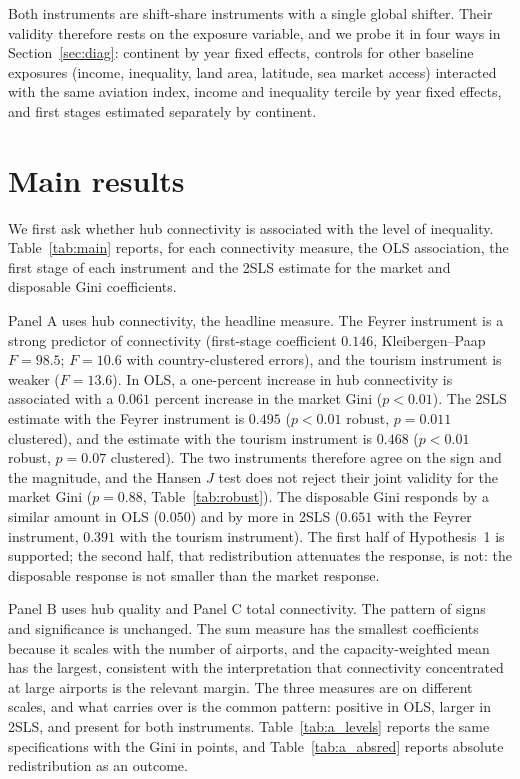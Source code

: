 \documentclass[12pt]{article}
\begin{document}
Both instruments are shift-share instruments with a single global shifter. Their validity therefore rests on the exposure variable, and we probe it in four ways in Section~\ref{sec:diag}: continent by year fixed effects, controls for other baseline exposures (income, inequality, land area, latitude, sea market access) interacted with the same aviation index, income and inequality tercile by year fixed effects, and first stages estimated separately by continent.

\section{Main results}
\label{sec:results}
We first ask whether hub connectivity is associated with the level of inequality. Table~\ref{tab:main} reports, for each connectivity measure, the OLS association, the first stage of each instrument and the 2SLS estimate for the market and disposable Gini coefficients.

Panel A uses hub connectivity, the headline measure. The Feyrer instrument is a strong predictor of connectivity (first-stage coefficient $0.146$, Kleibergen--Paap $F=98.5$; $F=10.6$ with country-clustered errors), and the tourism instrument is weaker ($F=13.6$). In OLS, a one-percent increase in hub connectivity is associated with a $0.061$ percent increase in the market Gini ($p<0.01$). The 2SLS estimate with the Feyrer instrument is $0.495$ ($p<0.01$ robust, $p=0.011$ clustered), and the estimate with the tourism instrument is $0.468$ ($p<0.01$ robust, $p=0.07$ clustered). The two instruments therefore agree on the sign and the magnitude, and the Hansen $J$ test does not reject their joint validity for the market Gini ($p=0.88$, Table~\ref{tab:robust}). The disposable Gini responds by a similar amount in OLS ($0.050$) and by more in 2SLS ($0.651$ with the Feyrer instrument, $0.391$ with the tourism instrument). The first half of Hypothesis~1 is supported; the second half, that redistribution attenuates the response, is not: the disposable response is not smaller than the market response.

Panel B uses hub quality and Panel C total connectivity. The pattern of signs and significance is unchanged. The sum measure has the smallest coefficients because it scales with the number of airports, and the capacity-weighted mean has the largest, consistent with the interpretation that connectivity concentrated at large airports is the relevant margin. The three measures are on different scales, and what carries over is the common pattern: positive in OLS, larger in 2SLS, and present for both instruments. Table~\ref{tab:a_levels} reports the same specifications with the Gini in points, and Table~\ref{tab:a_absred} reports absolute redistribution as an outcome.
\end{document}
